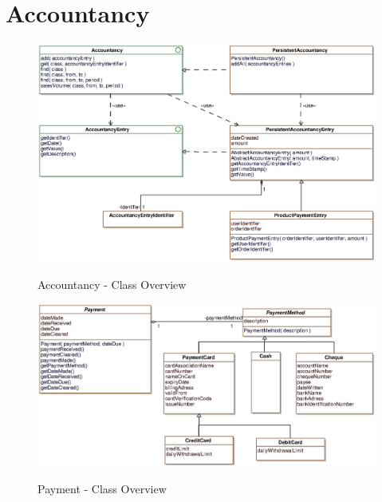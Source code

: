 \newpage
\section{Accountancy}

\begin{figure}[ht]
	\centering
  \includegraphics[width=1.0\textwidth]{images/Accountancy_Overview.eps}
	\label{accountancy_overview}
	\caption{Accountancy - Class Overview}
\end{figure}

\begin{figure}[ht]
	\centering
  \includegraphics[width=1.0\textwidth]{images/Payment_Overview.eps}
	\label{payment_overview}
	\caption{Payment - Class Overview}
\end{figure}
